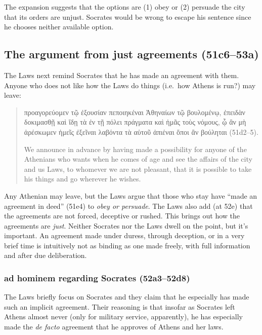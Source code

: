 \documentclass[12pt,letterpaper]{article}
\begin{document}
The expansion suggests that the options are (1) obey or (2) persuade the city that its orders are unjust.
Socrates would be wrong to escape his sentence since he chooses neither available option.

\subsection*{The argument from just agreements (51c6--53a)}

The Laws next remind Socrates that he has made an agreement with them.
Anyone who does not like how the Laws do things (i.e.\ how Athens is run?) may leave:

\begin{quote}

    \textgreek{προαγορεύομεν τῷ ἐξουσίαν πεποιηκέναι Ἀθηναίων τῷ βουλομένῳ, ἐπειδὰν δοκιμασθῇ καὶ ἴδῃ τὰ ἐν τῇ πόλει πράγματα καὶ ἡμᾶς τοὺς νόμους, ᾧ ἂν μὴ ἀρέσκωμεν ἡμεῖς ἐξεῖναι λαβόντα τὰ αὑτοῦ ἀπιέναι ὅποι ἂν βούληται} (51d2--5).

    We announce in advance by having made a possibility for anyone of the Athenians who wants when he comes of age and see the affairs of the city and us Laws, to whomever we are not pleasant, that it is possible to take his things and go wherever he wishes.

\end{quote}

Any Athenian may leave, but the Laws argue that those who stay have ``made an agreement in deed'' (51e4) to \emph{obey or persuade}.
The Laws also add (at 52e) that the agreements are not forced, deceptive or rushed.
This brings out how the agreements are \emph{just}.
Neither Socrates nor the Laws dwell on the point, but it's important.
An agreement made under duress, through deception, or in a very brief time is intuitively not as binding as one made freely, with full information and after due deliberation.

\subsubsection*{ad hominem regarding Socrates (52a3--52d8)}

The Laws briefly focus on Socrates and they claim that he especially has made such an implicit agreement.
Their reasoning is that insofar as Socrates left Athens almost never (only for military service, apparently), he has especially made the \textit{de facto} agreement that he approves of Athens and her laws.
\end{document}
